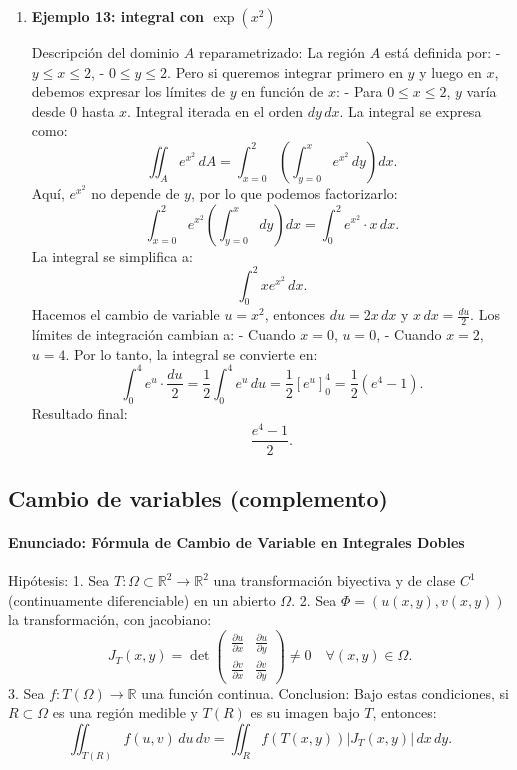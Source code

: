 \documentclass[11pt]{book}
\theoremstyle{definicion}
\theoremstyle{teorema}
\theoremstyle{ejemplo}
\begin{document}
\begin{enumerate}
\item 
\textbf{Ejemplo 13: integral con $\exp(x^2)$}

Descripción del dominio \(A\) reparametrizado:
La región \(A\) está definida por:
- \(y \leq x \leq 2\),
- \(0 \leq y \leq 2\).
Pero si queremos integrar primero en \(y\) y luego en \(x\), debemos expresar los límites de \(y\) en función de \(x\):
- Para \(0 \leq x \leq 2\), \(y\) varía desde \(0\) hasta \(x\).
Integral iterada en el orden \(dy \, dx\).
La integral se expresa como:
\[
\iint_A e^{x^2} \, dA = \int_{x=0}^{2} \left( \int_{y=0}^{x} e^{x^2} \, dy \right) dx.
\]
Aquí, \(e^{x^2}\) no depende de \(y\), por lo que podemos factorizarlo:
\[
\int_{x=0}^{2} e^{x^2} \left( \int_{y=0}^{x} dy \right) dx = \int_{0}^{2} e^{x^2} \cdot x \, dx.
\]
La integral se simplifica a:
\[
\int_{0}^{2} x e^{x^2} \, dx.
\]
Hacemos el cambio de variable \(u = x^2\), entonces \(du = 2x \, dx\) y \(x \, dx = \frac{du}{2}\). Los límites de integración cambian a:
- Cuando \(x = 0\), \(u = 0\),
- Cuando \(x = 2\), \(u = 4\).
Por lo tanto, la integral se convierte en:
\[
\int_{0}^{4} e^{u} \cdot \frac{du}{2} = \frac{1}{2} \int_{0}^{4} e^{u} \, du = \frac{1}{2} \left[ e^{u} \right]_{0}^{4} = \frac{1}{2} (e^{4} - 1).
\]
Resultado final:
\[
\boxed{\frac{e^{4} - 1}{2}}.
\]

\end{enumerate}

\subsection{Cambio de variables (complemento)}

\paragraph{Enunciado: Fórmula de Cambio de Variable en Integrales Dobles}
%
Hipótesis:
1. Sea \( T: \Omega \subset \mathbb{R}^2 \to \mathbb{R}^2 \) una transformación biyectiva y de clase \( C^1 \) (continuamente diferenciable) en un abierto \( \Omega \).
2. Sea \( \Phi = (u(x,y), v(x,y)) \) la transformación, con jacobiano:
   \[
   J_T(x,y) = \det \begin{pmatrix}
   \frac{\partial u}{\partial x} & \frac{\partial u}{\partial y} \\
   \frac{\partial v}{\partial x} & \frac{\partial v}{\partial y}
   \end{pmatrix} \neq 0 \quad \forall (x,y) \in \Omega.
   \]
3. Sea \( f: T(\Omega) \to \mathbb{R} \) una función continua.
Conclusion:
Bajo estas condiciones, si \( R \subset \Omega \) es una región medible y \( T(R) \) es su imagen bajo \( T \), entonces:
\[
\iint_{T(R)} f(u,v) \, du \, dv = \iint_{R} f(T(x,y)) |J_T(x,y)| \, dx \, dy.
\]
\end{document}
